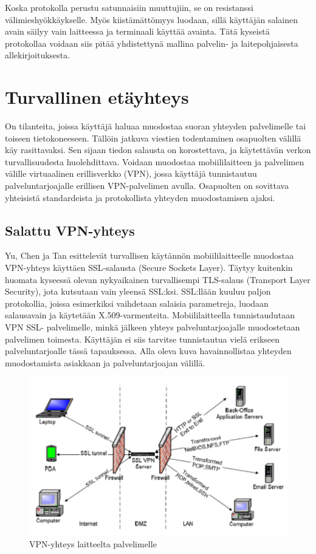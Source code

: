 \documentclass[finnish]{tktltiki2}
\theoremstyle{definition}
\theoremstyle{remark}
\begin{document}
Koska protokolla perustu satunnaisiin muuttujiin, se on resistanssi välimieshyökkäykselle. Myös kiistämättömyys luodaan, sillä käyttäjän salainen avain säilyy vain laitteessa ja terminaali käyttää avainta. Tätä kyseistä protokollaa voidaan siis pitää yhdistettynä mallina palvelin- ja laitepohjaisesta allekirjoituksesta.


\section{Turvallinen etäyhteys}

On tilanteita, joissa käyttäjä haluaa muodostaa suoran yhteyden palvelimelle tai toiseen tietokoneeseen. Tällöin jatkuva viestien todentaminen osapuolten välillä käy rasittavaksi. Sen sijaan tiedon salausta on korostettava, ja käytettävän verkon turvallisuudesta huolehdittava. Voidaan muodostaa mobiililaitteen ja palvelimen välille virtuaalinen erillisverkko (VPN), jossa käyttäjä tunnistautuu palveluntarjoajalle erillisen VPN-palvelimen avulla. Osapuolten on sovittava yhteisistä standardeista ja protokollista yhteyden muodostamisen ajaksi.

\subsection{Salattu VPN-yhteys}

Yu, Chen ja Tan \cite{vpn} esittelevät turvallisen käytännön mobiililaitteelle muodostaa VPN-yhteys käyttäen SSL-salausta (Secure Sockets Layer). Täytyy kuitenkin huomata kyseessä olevan nykyaikainen turvallisempi TLS-salaus (Transport Layer Security), jota kutsutaan vain yleensä SSL:ksi. SSL:llään kuuluu paljon protokollia, joissa esimerkiksi vaihdetaan salaisia parametreja, luodaan salausavain ja käytetään X.509-varmenteita. Mobiililaitteella tunnistaudutaan VPN SSL- palvelimelle, minkä jälkeen yhteys palveluntarjoajalle muodostetaan palvelimen toimesta. Käyttäjän ei siis tarvitse tunnistautua vielä erikseen palveluntarjoalle tässä tapauksessa. Alla oleva kuva havainnollistaa yhteyden muodostamista asiakkaan ja palveluntarjoajan välillä.

 
\begin{figure}[h!]
\centering
	\includegraphics[scale=0.5]{VPN-tunneli}
\caption{VPN-yhteys laitteelta palvelimelle \cite{vpn}}
\end{figure}	
\end{document}
